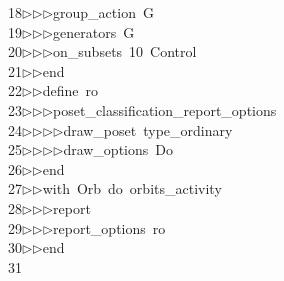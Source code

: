 \begin{tabbing}
18\>$\triangleright$\>$\triangleright$\>$\triangleright$\>group\_action\ G\ \\[0pt]
19\>$\triangleright$\>$\triangleright$\>$\triangleright$\>generators\ G\ \\[0pt]
20\>$\triangleright$\>$\triangleright$\>$\triangleright$\>on\_subsets\ 10\ Control\ \\[0pt]
21\>$\triangleright$\>$\triangleright$\>end\ \\[0pt]
22\>$\triangleright$\>$\triangleright$\>define\ ro\ \\[0pt]
23\>$\triangleright$\>$\triangleright$\>$\triangleright$\>poset\_classification\_report\_options\ \\[0pt]
24\>$\triangleright$\>$\triangleright$\>$\triangleright$\>$\triangleright$\>draw\_poset\ type\_ordinary\ \\[0pt]
25\>$\triangleright$\>$\triangleright$\>$\triangleright$\>$\triangleright$\>draw\_options\ Do\ \\[0pt]
26\>$\triangleright$\>$\triangleright$\>end\ \\[0pt]
27\>$\triangleright$\>$\triangleright$\>with\ Orb\ do\ orbits\_activity\ \\[0pt]
28\>$\triangleright$\>$\triangleright$\>$\triangleright$\>report\ \ \\[0pt]
29\>$\triangleright$\>$\triangleright$\>$\triangleright$\>report\_options\ ro\ \\[0pt]
30\>$\triangleright$\>$\triangleright$\>end\ \\[0pt]
31\>\end{tabbing}
